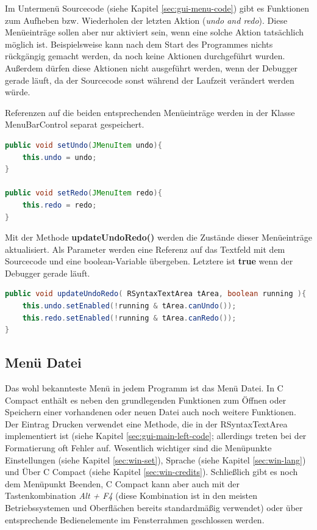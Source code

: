 Im Untermenü \glqq{}Sourcecode\grqq{} (siehe Kapitel \ref{sec:gui-menu-code}) gibt es Funktionen zum Aufheben bzw. Wiederholen der letzten Aktion (\emph{undo and redo}). Diese Menüeinträge sollen aber nur aktiviert sein, wenn eine solche Aktion tatsächlich möglich ist. Beispielsweise kann nach dem Start des Programmes nichts rückgängig gemacht werden, da noch keine Aktionen durchgeführt wurden. Außerdem dürfen diese Aktionen nicht ausgeführt werden, wenn der Debugger gerade läuft, da der Sourcecode sonst während der Laufzeit verändert werden würde.

Referenzen auf die beiden entsprechenden Menüeinträge werden in der Klasse MenuBarControl separat gespeichert.
\begin{lstlisting}[language=JAVA]
public void setUndo(JMenuItem undo){
	this.undo = undo;
}

public void setRedo(JMenuItem redo){
	this.redo = redo;
}
\end{lstlisting}

Mit der Methode \textbf{updateUndoRedo()} werden die Zustände dieser Menüeinträge aktualisiert. Als Parameter werden eine Referenz auf das Textfeld mit dem Sourcecode und eine boolean-Variable übergeben. Letztere ist \textbf{true} wenn der Debugger gerade läuft.
\begin{lstlisting}[language=JAVA]
public void updateUndoRedo( RSyntaxTextArea tArea, boolean running ){
	this.undo.setEnabled(!running & tArea.canUndo());
	this.redo.setEnabled(!running & tArea.canRedo());
}
\end{lstlisting}

\subsection{Menü \glqq{}Datei\grqq{}}
\label{sec:gui-main-menu-file}
Das wohl bekannteste Menü in jedem Programm ist das Menü \glqq{}Datei\grqq{}. In C Compact enthält es neben den grundlegenden Funktionen zum Öffnen oder Speichern einer vorhandenen oder neuen Datei auch noch weitere Funktionen. Der Eintrag \glqq{}Drucken\grqq{} verwendet eine Methode, die in der RSyntaxTextArea implementiert ist (siehe Kapitel \ref{sec:gui-main-left-code}; allerdings treten bei der Formatierung oft Fehler auf. Wesentlich wichtiger sind die Menüpunkte \glqq{}Einstellungen\grqq{} (siehe Kapitel \ref{sec:win-set}), \glqq{}Sprache\grqq{} (siehe Kapitel \ref{sec:win-lang}) und \glqq{}Über C Compact\grqq{} (siehe Kapitel \ref{sec:win-credits}). Schließlich gibt es noch dem Menüpunkt \glqq{}Beenden\grqq{}, C Compact kann aber auch mit der Tastenkombination \emph{Alt + F4} (diese Kombination ist in den meisten Betriebssystemen und Oberflächen bereits standardmäßig verwendet) oder über entsprechende Bedienelemente im Fensterrahmen geschlossen werden.

